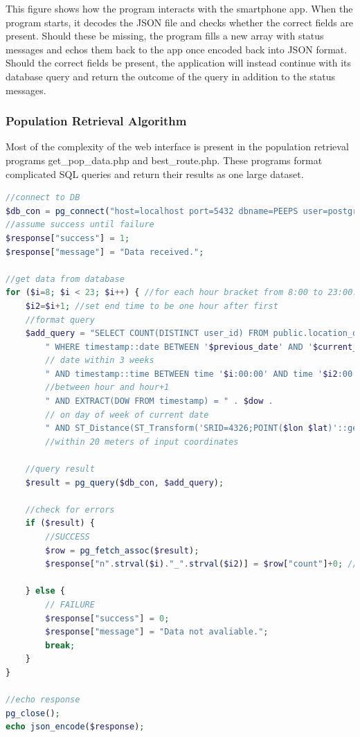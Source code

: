 This figure shows how the program interacts with the smartphone app. When the program starts, it decodes the JSON file and checks whether the correct fields are present. Should these be missing, the program fills a new array with status messages and echos them back to the app once encoded back into JSON format. Should the correct fields be present, the application will instead continue with its database query and return the outcome of the query in addition to the status messages.

\subsubsection{Population Retrieval Algorithm}
Most of the complexity of the web interface is present in the population retrieval programs get\_pop\_data.php and best\_route.php. These programs format complicated SQL queries and return their results as one large dataset. 

\begin{lstlisting}[caption={\detokenize{get_pop_data.php's population-data extraction algorythm. }},label={lst:php_login},language=php]
//connect to DB
$db_con = pg_connect("host=localhost port=5432 dbname=PEEPS user=postgres password=admin");
//assume success until failure
$response["success"] = 1;
$response["message"] = "Data received.";

//get data from database
for ($i=8; $i < 23; $i++) { //for each hour bracket from 8:00 to 23:00:
    $i2=$i+1; //set end time to be one hour after first
    //format query
    $add_query = "SELECT COUNT(DISTINCT user_id) FROM public.location_data" .
        " WHERE timestamp::date BETWEEN '$previous_date' AND '$current_date'" . 
        // date within 3 weeks
        " AND timestamp::time BETWEEN time '$i:00:00' AND time '$i2:00:00'" . 
        //between hour and hour+1
        " AND EXTRACT(DOW FROM timestamp) = " . $dow . 
        // on day of week of current date
        " AND ST_Distance(ST_Transform('SRID=4326;POINT($lon $lat)'::geometry, 3857), ST_Transform(ST_SetSRID(coordinates,4326),3857))  <= 20"; 
        //within 20 meters of input coordinates

    //query result
    $result = pg_query($db_con, $add_query);

    //check for errors
    if ($result) {
        //SUCCESS
        $row = pg_fetch_assoc($result);
        $response["n".strval($i)."_".strval($i2)] = $row["count"]+0; //ie: n8_9

    } else {
        // FAILURE
        $response["success"] = 0;
        $response["message"] = "Data not avaliable.";
        break;
    }
}

//echo response
pg_close();
echo json_encode($response);
\end{lstlisting}

